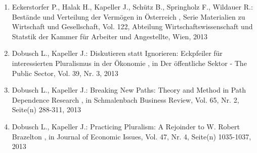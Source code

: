 \begin{enumerate}[leftmargin=*, labelsep=0.5cm]
	 \item Eckerstorfer P., Halak H., Kapeller J., Schütz B., Springholz F., Wildauer R.:  Bestände und Verteilung der Vermögen in Österreich  , Serie Materialien zu Wirtschaft und Gesellschaft, Vol. 122, Abteilung Wirtschaftswissenschaft und Statstik der Kammer für Arbeiter und Angestellte, Wien, 2013
	 \item Dobusch L., Kapeller J.:  Diskutieren statt Ignorieren: Eckpfeiler für interessierten Pluralismus in der Ökonomie  , in Der öffentliche Sektor - The Public Sector, Vol. 39, Nr. 3, 2013
	 \item Dobusch L., Kapeller J.:  Breaking New Paths: Theory and Method in Path Dependence Research  , in Schmalenbach Business Review, Vol. 65, Nr. 2, Seite(n) 288-311, 2013
	 \item Dobusch L., Kapeller J.:  Practicing Pluralism: A Rejoinder to W. Robert Brazelton  , in Journal of Economic Issues, Vol. 47, Nr. 4, Seite(n) 1035-1037, 2013
\end{enumerate} 

